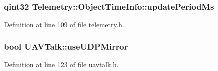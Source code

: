 \hypertarget{group___u_a_v_talk_plugin_ga63538585df200e147d34a4a929976b4d}{
\subsubsection[{update\-Period\-Ms}]{\setlength{\rightskip}{0pt plus 5cm}qint32 \-Telemetry\-::\-Object\-Time\-Info\-::update\-Period\-Ms}}\label{group___u_a_v_talk_plugin_ga63538585df200e147d34a4a929976b4d}


\-Definition at line 109 of file telemetry.\-h.

\hypertarget{group___u_a_v_talk_plugin_ga5198259bc34e6f215c111d731b822e3f}{
\subsubsection[{use\-U\-D\-P\-Mirror}]{\setlength{\rightskip}{0pt plus 5cm}bool {\bf \-U\-A\-V\-Talk\-::use\-U\-D\-P\-Mirror}}}\label{group___u_a_v_talk_plugin_ga5198259bc34e6f215c111d731b822e3f}


\-Definition at line 123 of file uavtalk.\-h.



